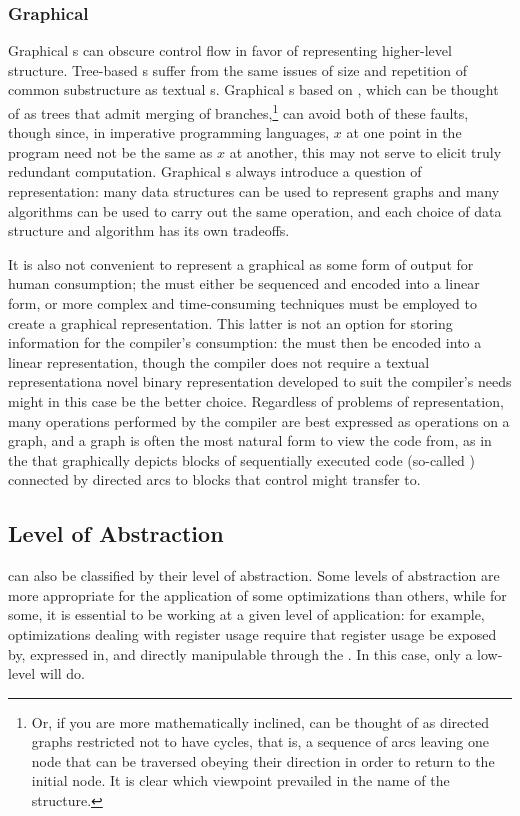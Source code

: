 \subsubsection{Graphical}
Graphical s can obscure control flow in favor of representing higher-level structure. Tree-based s suffer from the same issues of size and repetition of common substructure as textual s. Graphical s based on , which can be thought of as trees that admit merging of branches,\footnote{Or, if you are more mathematically inclined, can be thought of as directed graphs restricted not to have cycles, that is, a sequence of arcs leaving one node that can be traversed obeying their direction in order to return to the initial node. It is clear which viewpoint prevailed in the name of the structure.} can avoid both of these faults, though since, in imperative programming languages, $x$ at one point in the program need not be the same as $x$ at another, this may not serve to elicit truly redundant computation. Graphical s always introduce a question of representation: many data structures can be used to represent graphs and many algorithms can be used to carry out the same operation, and each choice of data structure and algorithm has its own tradeoffs.

It is also not convenient to represent a graphical  as some form of output for human consumption; the  must either be sequenced and encoded into a linear form, or more complex and time-consuming techniques must be employed to create a graphical representation. This latter is not an option for storing information for the compiler's consumption: the  must then be encoded into a linear representation, though the compiler does not require a textual representation\empause a novel binary representation developed to suit the compiler's needs might in this case be the better choice. Regardless of problems of representation, many operations performed by the compiler are best expressed as operations on a graph, and a graph is often the most natural form to view the code from, as in the  that graphically depicts blocks of sequentially executed code (so-called ) connected by directed arcs to blocks that control might transfer to.

\subsection{Level of Abstraction}
\IRs can also be classified by their level of abstraction. Some levels of abstraction are more appropriate for the application of some optimizations than others, while for some, it is essential to be working at a given level of application: for example, optimizations dealing with register usage require that register usage be exposed by, expressed in, and directly manipulable through the \IR{}. In this case, only a low-level \IR will do.

